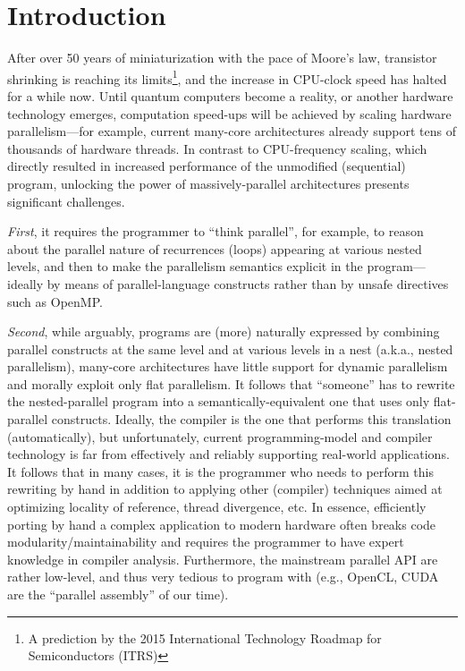 \chapter{Introduction}
\label{chapter:Introduction}
After over 50 years of miniaturization with the pace of Moore's law\cite{cmcoic}, transistor shrinking is reaching its limits\footnote{A prediction by the 2015 International Technology Roadmap for Semiconductors (ITRS)}, and the increase in CPU-clock speed has halted for a while now. Until quantum computers become a reality, or another hardware technology emerges, computation speed-ups will be achieved by scaling hardware parallelism---for example, current many-core architectures already support tens of thousands of hardware threads.   In contrast to CPU-frequency scaling, which directly resulted in increased performance of the unmodified (sequential) program, unlocking the power of massively-parallel architectures presents significant challenges.   

{\em First}, it requires the programmer to ``think parallel'', for example, to reason about the parallel nature of recurrences (loops) appearing at various nested levels, and then to make the parallelism semantics explicit in the program---ideally by means of parallel-language constructs rather than by unsafe directives such as OpenMP.

{\em Second}, while arguably, programs are (more) naturally expressed by combining parallel constructs at the same level and at various levels in a nest (a.k.a., nested parallelism), many-core architectures have little support for dynamic parallelism and morally exploit only flat parallelism. It follows that ``someone'' has to rewrite the nested-parallel program into a semantically-equivalent one that uses only flat-parallel constructs. Ideally, the compiler is the one that performs this translation (automatically), but unfortunately, current programming-model and compiler technology is far from effectively and reliably supporting real-world applications.   It follows that in many cases, it is the programmer who needs to perform this rewriting by hand in addition to applying other (compiler) techniques aimed at optimizing locality of reference, thread divergence, etc. In essence, efficiently porting by hand a complex application to modern hardware often breaks code modularity/maintainability and requires the programmer to have expert knowledge in compiler analysis. Furthermore, the mainstream parallel API are rather low-level, and thus very tedious to program with (e.g., OpenCL, CUDA are the ``parallel assembly'' of our time). 

